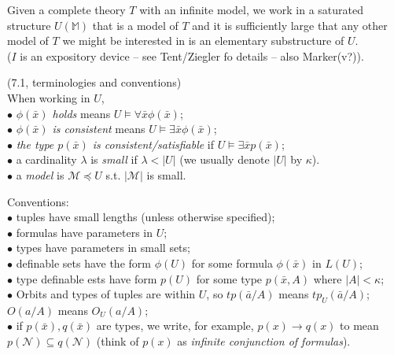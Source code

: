 \documentclass[a4paper]{article}
\begin{document}
Given a complete theory $T$ with an infinite model, we work in a saturated structure $U(\mathbb{M})$ that is a model of $T$ and it is sufficiently large that any other model of $T$ we might be interested in is an elementary substructure of $U$.\\
($I$ is an expository device -- see Tent/Ziegler fo details -- also Marker(v?)).

\begin{defi} (7.1, terminologies and conventions)\\
    When working in $U$, \\
    $\bullet$ \emph{$\phi(\bar{x})$ holds} means $U \vDash \forall \bar{x} \phi(\bar{x})$;\\
    $\bullet$ \emph{$\phi(\bar{x})$ is consistent} means $U\vDash \exists \bar{x} \phi(\bar{x})$;\\
    $\bullet$ \emph{the type $p(\bar{x})$ is consistent/satisfiable} if $U \vDash \exists \bar{x} p(\bar{x})$;\\
    $\bullet$ a cardinality $\lambda$ is \emph{small} if $\lambda < |U|$ (we usually denote $|U|$ by $\kappa$).\\
    $\bullet$ a \emph{model} is $\mathcal{M} \preccurlyeq U$ s.t. $|\mathcal{M}|$ is small.

    Conventions:\\
    $\bullet$ tuples have small lengths (unless otherwise specified);\\
    $\bullet$ formulas have parameters in $U$;\\
    $\bullet$ types have parameters in small sets;\\
    $\bullet$ definable sets have the form $\phi(U)$ for some formula $\phi(\bar{x})$ in $L(U)$;\\
    $\bullet$ type definable ests have form $p(U)$ for some type $p(\bar{x},A)$ where $|A| < \kappa$;\\
    $\bullet$ Orbits and types of tuples are within $U$, so $tp(\bar{a}/A)$ means $tp_U(\bar{a}/A)$; $O(a/A)$ means $O_U(a/A)$;\\
    $\bullet$ if $p(\bar{x}),q(\bar{x})$ are types, we write, for example, $p(x) \to q(x)$ to mean $p(\mathcal{N}) \subseteq q(\mathcal{N})$ (think of $p(x)$ as \emph{infinite conjunction of formulas}).
\end{defi}
\end{document}
